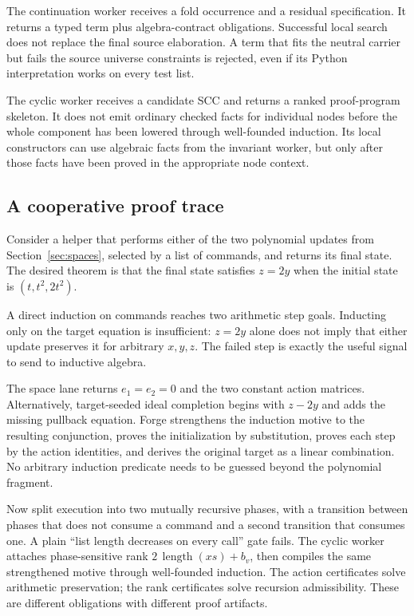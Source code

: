The continuation worker receives a fold occurrence and a residual specification.
It returns a typed term plus algebra-contract obligations. Successful local
search does not replace the final source elaboration. A term that fits the
neutral carrier but fails the source universe constraints is rejected, even if
its Python interpretation works on every test list.

The cyclic worker receives a candidate SCC and returns a ranked proof-program
skeleton. It does not emit ordinary checked facts for individual nodes before
the whole component has been lowered through well-founded induction. Its local
constructors can use algebraic facts from the invariant worker, but only after
those facts have been proved in the appropriate node context.

\subsection{A cooperative proof trace}

Consider a helper that performs either of the two polynomial updates from
Section~\ref{sec:spaces}, selected by a list of commands, and returns its final
state. The desired theorem is that the final state satisfies $z=2y$ when the
initial state is $(t,t^2,2t^2)$.

A direct induction on commands reaches two arithmetic step goals. Inducting only
on the target equation is insufficient: $z=2y$ alone does not imply that either
update preserves it for arbitrary $x,y,z$. The failed step is exactly the useful
signal to send to inductive algebra.

The space lane returns $e_1=e_2=0$ and the two constant action matrices.
Alternatively, target-seeded ideal completion begins with $z-2y$ and adds the
missing pullback equation. Forge strengthens the induction motive to the
resulting conjunction, proves the initialization by substitution, proves each
step by the action identities, and derives the original target as a linear
combination. No arbitrary induction predicate needs to be guessed beyond the
polynomial fragment.

Now split execution into two mutually recursive phases, with a transition
between phases that does not consume a command and a second transition that
consumes one. A plain ``list length decreases on every call'' gate fails. The
cyclic worker attaches phase-sensitive rank $2\,\operatorname{length}(xs)+b_v$,
then compiles the same strengthened motive through well-founded induction.
The action certificates solve arithmetic preservation; the rank certificates
solve recursion admissibility. These are different obligations with different
proof artifacts.

